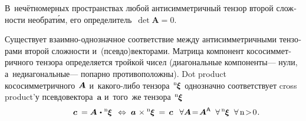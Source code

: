 \begin{otherlanguage}{russian}
В~нечётномерных пространствах любой антисимметричный тензор второй сложности необрат\'{и}м, его определитель~${\operatorname{det} \bm{A} = 0}$.

Существует взаимно\hbox{-}однозначное соответствие между антисимметричными тензорами второй сложности и~(псевдо)векторами. Матрица компонент кососимметричного тензора определяется тройкой чисел (диагональные компоненты\:--- нули, а~недиагональные\:--- попарно противоположны). Dot product кососимметричного~${\hspace{-0.2ex}\bm{A}}$ и~какого\hbox{-}либо тензора~${\hspace{-0.2ex}{^\mathrm{n}\hspace{-0.12ex}\bm{\xi}}}$ однозначно соответствует cross product’у псевдовектора~$\bm{a}$ и~того~же тензора~${\hspace{-0.2ex}{^\mathrm{n}\hspace{-0.12ex}\bm{\xi}}}$
\nopagebreak\vspace{.2em}\begin{equation}
\hspace{3.2em} \bm{c} \:= \bm{A} \hspace{0.2ex}\dotp\hspace{0.1ex} {^\mathrm{n}\hspace{-0.12ex}\bm{\xi}} \;\,\Leftrightarrow\; \bm{a} \hspace{0.2ex}\times {^\mathrm{n}\hspace{-0.12ex}\bm{\xi}} \:=\, \bm{c} \hspace{0.1ex} \;\:\:
\forall \bm{A} \!=\! \bm{A}^{\mathsf{\!\,A}} \;\; \forall \, {^\mathrm{n}\hspace{-0.12ex}\bm{\xi}} \;\; \forall \,\mathrm{n \!>\! 0} \hspace{0.16ex}.
\end{equation}


\end{otherlanguage}
